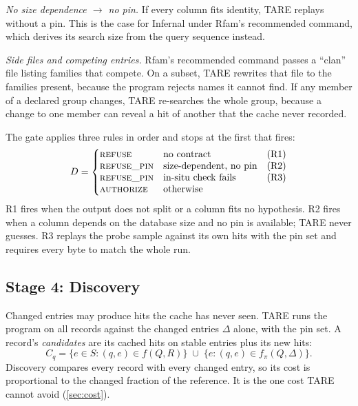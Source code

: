 \documentclass[letterpaper,twocolumn,10pt]{article}
\theoremstyle{definition}
\newcommand{\sys}{TARE\xspace}
\newcommand{\dec}[1]{\textsc{#1}}
\begin{document}
\textit{No size dependence $\rightarrow$ no pin.} If every column fits identity, \sys replays without a pin. This is the
case for Infernal under Rfam's recommended command, which derives its search size from the query sequence instead.

\textit{Side files and competing entries.} Rfam's recommended command passes a ``clan'' file listing families that
compete. On a subset, \sys rewrites that file to the families present, because the program rejects names it cannot
find. If any member of a declared group changes, \sys re-searches the whole group, because a change to one member
can reveal a hit of another that the cache never recorded.

The gate applies three rules in order and stops at the first that fires:
\begin{equation}
D = \left\{\begin{array}{@{}lll@{}}
\dec{refuse} & \text{no contract} & \text{(R1)}\\
\dec{refuse\_pin} & \text{size-dependent, no pin} & \text{(R2)}\\
\dec{refuse\_pin} & \text{in-situ check fails} & \text{(R3)}\\
\dec{authorize} & \text{otherwise} &
\end{array}\right.
\label{eq:gate}
\end{equation}
R1 fires when the output does not split or a column fits no hypothesis. R2 fires when a column depends on the database
size and no pin is available; \sys never guesses. R3 replays the probe sample against its own hits with the pin set and
requires every byte to match the whole run.

\subsection{Stage 4: Discovery}

Changed entries may produce hits the cache has never seen. \sys runs the program on all records against the changed
entries $\Delta$ alone, with the pin set. A record's \textit{candidates} are its cached hits on stable entries plus its
new hits:
\begin{equation}
C_q = \{e \in S : (q,e) \in f(Q,R)\} \;\cup\; \{e : (q,e) \in f_\pi(Q,\Delta)\}.
\label{eq:cand}
\end{equation}
Discovery compares every record with every changed entry, so its cost is proportional to the changed fraction of the
reference. It is the one cost \sys cannot avoid (\cref{sec:cost}).
\end{document}
